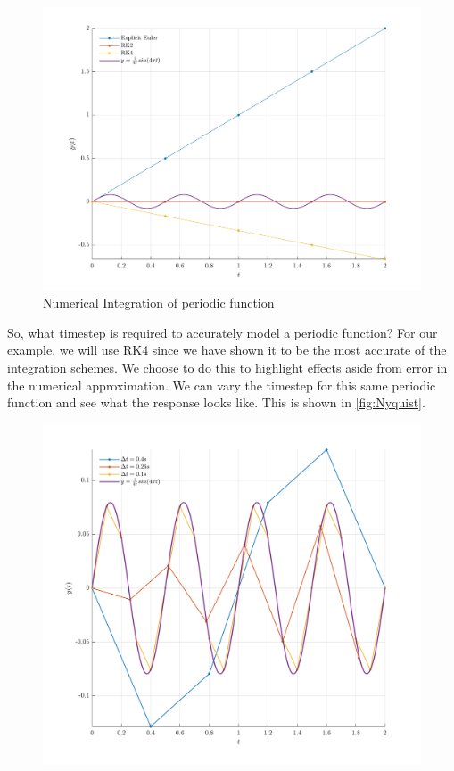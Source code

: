 \documentclass[12pt]{report}
\begin{document}
{\begin{figure} [ht]
    \centering
    \includegraphics[width=\linewidth]{6DoF Explanation Scripts/Numerical Integrator Nyquist 1.png}
    \caption{Numerical Integration of periodic function}
    \label{fig:Numerical Int Periodic}
\end{figure}
So, what timestep is required to accurately model a periodic function? For our example, we will use RK4 since we have shown it to be the most accurate of the integration schemes. We choose to do this to highlight effects aside from error in the numerical approximation. We can vary the timestep for this same periodic function and see what the response looks like. This is shown in \ref{fig:Nyquist}.
\begin{figure}[ht]
    \centering
    \includegraphics[width=0.9\linewidth]{6DoF Explanation Scripts/Numerical Integrator Nyquist 2.png}
    

\end{figure}}
\end{document}
